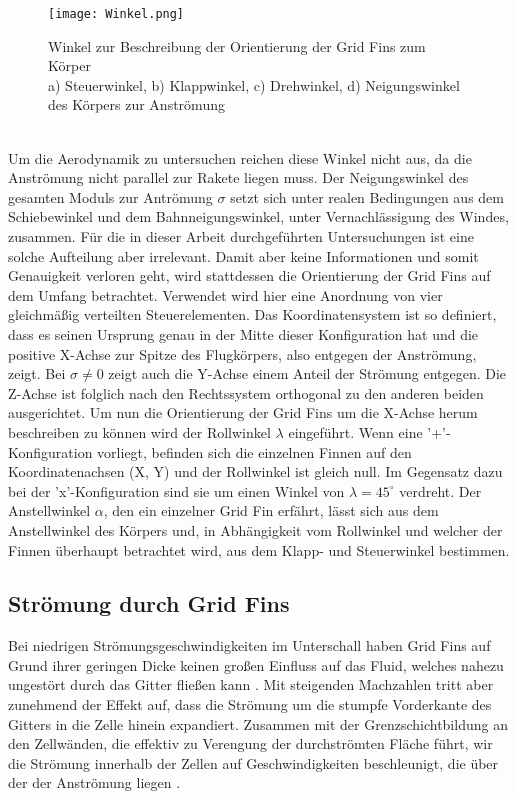 \begin{figure}[h]
	\centering
	\texttt{[image: Winkel.png]}
	\caption{Winkel zur Beschreibung der Orientierung der Grid Fins zum Körper\\a) Steuerwinkel, b) Klappwinkel, c) Drehwinkel, d) Neigungswinkel des Körpers zur Anströmung}
	\label{abb_winkel}
\end{figure}\\
Um die Aerodynamik zu untersuchen reichen diese Winkel nicht aus, da die Anströmung nicht parallel zur Rakete liegen muss. Der Neigungswinkel des gesamten Moduls zur Antrömung $\sigma$ setzt sich unter realen Bedingungen aus dem Schiebewinkel und dem Bahnneigungswinkel, unter Vernachlässigung des Windes, zusammen. Für die in dieser Arbeit durchgeführten Untersuchungen ist eine solche Aufteilung aber irrelevant. Damit aber keine Informationen und somit Genauigkeit verloren geht, wird stattdessen die Orientierung der Grid Fins auf dem Umfang betrachtet. Verwendet wird hier eine Anordnung von vier gleichmäßig verteilten Steuerelementen. Das Koordinatensystem ist so definiert, dass es seinen Ursprung genau in der Mitte dieser Konfiguration hat und die positive X-Achse zur Spitze des Flugkörpers, also entgegen der Anströmung, zeigt. Bei $\sigma \neq 0$ zeigt auch die Y-Achse einem Anteil der Strömung entgegen. Die Z-Achse ist folglich nach den Rechtssystem orthogonal zu den anderen beiden ausgerichtet. Um nun die Orientierung der Grid Fins um die X-Achse herum beschreiben zu können wird der Rollwinkel $\lambda$ eingeführt. Wenn eine '+'-Konfiguration vorliegt, befinden sich die einzelnen Finnen auf den Koordinatenachsen (X, Y) und der Rollwinkel ist gleich null. Im Gegensatz dazu bei der 'x'-Konfiguration sind sie um einen Winkel von $\lambda = 45^\circ$ verdreht. Der Anstellwinkel $\alpha$, den ein einzelner Grid Fin erfährt, lässt sich aus dem Anstellwinkel des Körpers und, in Abhängigkeit vom Rollwinkel und welcher der Finnen überhaupt betrachtet wird, aus dem Klapp- und Steuerwinkel bestimmen.
\subsection{Strömung durch Grid Fins}
Bei niedrigen Strömungsgeschwindigkeiten im Unterschall haben Grid Fins auf Grund ihrer geringen Dicke keinen großen Einfluss auf das Fluid, welches nahezu ungestört durch das Gitter fließen kann \cite{sb-sharp}. Mit steigenden Machzahlen tritt aber zunehmend der Effekt auf, dass die Strömung um die stumpfe Vorderkante des Gitters in die Zelle hinein expandiert. Zusammen mit der Grenzschichtbildung an den Zellwänden, die effektiv zu Verengung der durchströmten Fläche führt, wir die Strömung innerhalb der Zellen auf Geschwindigkeiten beschleunigt, die über der der Anströmung liegen \cite{synopsis}.

